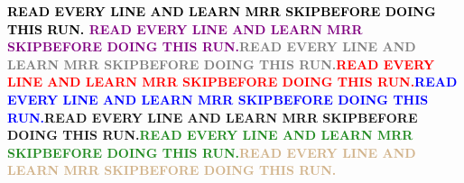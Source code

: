 \vspace*{\fill}
\begin{center}{\Huge \textbf{\textcolor{black}{READ EVERY LINE AND LEARN MRR SKIP\newline BEFORE DOING THIS RUN.} \newline\textcolor{purple}{READ EVERY LINE AND LEARN MRR SKIP\newline BEFORE DOING THIS RUN.}\newline\textcolor{gray}{READ EVERY LINE AND LEARN MRR SKIP\newline BEFORE DOING THIS RUN.}\newline\textcolor{red}{READ EVERY LINE AND LEARN MRR SKIP\newline BEFORE DOING THIS RUN.}\newline\textcolor{blue}{READ EVERY LINE AND LEARN MRR SKIP\newline BEFORE DOING THIS RUN.}\newline\textcolor{BurntOrange}{READ EVERY LINE AND LEARN MRR SKIP\newline BEFORE DOING THIS RUN.}\newline\textcolor{ForestGreen}{READ EVERY LINE AND LEARN MRR SKIP\newline BEFORE DOING THIS RUN.}\newline\textcolor{Tan}{READ EVERY LINE AND LEARN MRR SKIP\newline BEFORE DOING THIS RUN.}} }\end{center}
\vspace*{\fill}
\newpage
